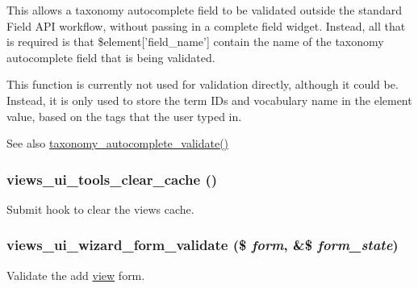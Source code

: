 This allows a taxonomy autocomplete field to be validated outside the standard Field API workflow, without passing in a complete field widget. Instead, all that is required is that \$element\mbox{[}'field\_\-name'\mbox{]} contain the name of the taxonomy autocomplete field that is being validated.

This function is currently not used for validation directly, although it could be. Instead, it is only used to store the term IDs and vocabulary name in the element value, based on the tags that the user typed in.

\begin{DoxySeeAlso}{See also}
\hyperlink{taxonomy_8module_a424a1d85875dc55781d8f0e840fae87e}{taxonomy\_\-autocomplete\_\-validate()} 
\end{DoxySeeAlso}
\hypertarget{admin_8inc_a20d738f2a5405c5fbbdbd82954bbf050}{
\subsubsection[{views\_\-ui\_\-tools\_\-clear\_\-cache}]{\setlength{\rightskip}{0pt plus 5cm}views\_\-ui\_\-tools\_\-clear\_\-cache ()}}
\label{admin_8inc_a20d738f2a5405c5fbbdbd82954bbf050}
Submit hook to clear the views cache. \hypertarget{admin_8inc_afe05234475107bed1bf649135bb7b4be}{
\subsubsection[{views\_\-ui\_\-wizard\_\-form\_\-validate}]{\setlength{\rightskip}{0pt plus 5cm}views\_\-ui\_\-wizard\_\-form\_\-validate (\$ {\em form}, \/  \&\$ {\em form\_\-state})}}
\label{admin_8inc_afe05234475107bed1bf649135bb7b4be}
Validate the add \hyperlink{classview}{view} form. 